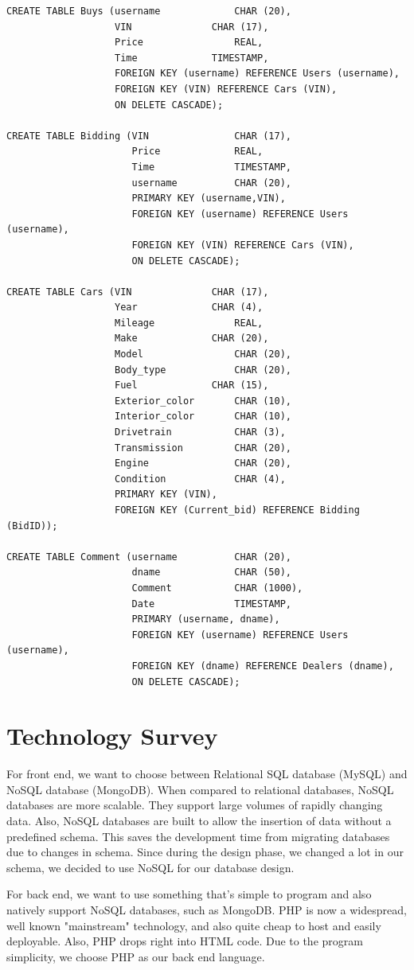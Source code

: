 \documentclass[12pt]{article}
\begin{document}
\begin{verbatim}
CREATE TABLE Buys (username				CHAR (20),
                   VIN				CHAR (17),
                   Price				REAL,
                   Time				TIMESTAMP,
                   FOREIGN KEY (username) REFERENCE Users (username),
                   FOREIGN KEY (VIN) REFERENCE Cars (VIN),
                   ON DELETE CASCADE);

CREATE TABLE Bidding (VIN				CHAR (17),
                      Price				REAL,
                      Time				TIMESTAMP,
                      username			CHAR (20),
                      PRIMARY KEY (username,VIN),
                      FOREIGN KEY (username) REFERENCE Users (username),
                      FOREIGN KEY (VIN) REFERENCE Cars (VIN),
                      ON DELETE CASCADE);
                      
CREATE TABLE Cars (VIN				CHAR (17),
                   Year				CHAR (4),
                   Mileage				REAL,
                   Make				CHAR (20),
                   Model				CHAR (20),
                   Body_type			CHAR (20),
                   Fuel				CHAR (15),
                   Exterior_color		CHAR (10),
                   Interior_color		CHAR (10),
                   Drivetrain			CHAR (3),
                   Transmission			CHAR (20),
                   Engine				CHAR (20),
                   Condition			CHAR (4),	
                   PRIMARY KEY (VIN),
                   FOREIGN KEY (Current_bid) REFERENCE Bidding (BidID));

CREATE TABLE Comment (username			CHAR (20),
                      dname				CHAR (50),
                      Comment			CHAR (1000),
                      Date				TIMESTAMP,
                      PRIMARY (username, dname),
                      FOREIGN KEY (username) REFERENCE Users (username),
                      FOREIGN KEY (dname) REFERENCE Dealers (dname),
                      ON DELETE CASCADE);
\end{verbatim}

\section{Technology Survey}
\par For front end, we want to choose between Relational SQL database (MySQL) and NoSQL database (MongoDB). When compared to relational databases, NoSQL databases are more scalable. They support large volumes of rapidly changing data. Also, NoSQL databases are built to allow the insertion of data without a predefined schema. This saves the development time from migrating databases due to changes in schema. Since during the design phase, we changed a lot in our schema, we decided to use NoSQL for our database design.
\par For back end, we want to use something that's simple to program and also natively support NoSQL databases, such as MongoDB. PHP is now a widespread, well known "mainstream" technology, and also quite cheap to host and easily deployable. Also, PHP drops right into HTML code. Due to the program simplicity, we choose PHP as our back end language.
\end{document}
